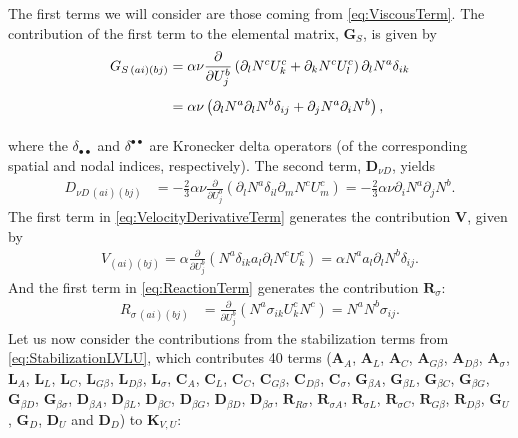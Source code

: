 The first terms we will consider are those coming from \cref{eq:ViscousTerm}. The contribution of the first term to the elemental matrix, $\mathbf{G}_S$, is given by
\begin{align} \label{eq:GSComponents}
  G_{S\, (ai)(bj)} & = \alpha \nu \frac{\partial }{\partial U_j^b} \left( \partial_l N^c U_k^c + \partial_k N^c U_l^c \right) \partial_l N^a \delta_{ik} \notag         \\
                   & \vphantom{\frac{\partial }{\partial U_j^b}} = \alpha \nu \left( \partial_l N^a \partial_l N^b \delta_{ij} + \partial_j N^a \partial_i N^b \right),
\end{align}
where the $\delta_{\bullet \bullet}$ and $\delta^{\bullet \bullet}$ are Kronecker delta operators (of the corresponding spatial and nodal indices, respectively).
The second term, $\mathbf{D}_{\nu D}$, yields
\begin{align} \label{eq:DDComponents}
  D_{\nu D\, (ai)(bj)} & = - \frac{2}{3} \alpha \nu \frac{\partial }{\partial U_j^b} \left( \partial_l N^a \delta_{il} \partial_m N^c U_m^c \right) = - \frac{2}{3} \alpha \nu \partial_i N^a \partial_j N^b.
\end{align}
The first term in \cref{eq:VelocityDerivativeTerm} generates the contribution $\mathbf{V}$, given by
\begin{align} \label{eq:VComponents}
  V_{(ai)(bj)} = \alpha \frac{\partial }{\partial U_j^b} \left( N^a \delta_{ik} a_l \partial_l N^c U_k^c \right) = \alpha N^a a_l \partial_l N^b \delta_{ij}.
\end{align}
And the first term in \cref{eq:ReactionTerm} generates the contribution $\mathbf{R}_\sigma$:
\begin{align} \label{eq:ReactionTermComponents}
  R_{\sigma\, (ai)(bj)} & = \frac{\partial }{\partial U_j^b} \left( N^a \sigma_{ik} U^c_k N^c \right) = N^aN^b \sigma_{ij}.
\end{align}
Let us now consider the contributions from the stabilization terms from \cref{eq:StabilizationLVLU}, which contributes 40 terms ($\mathbf{A}_A$, $\mathbf{A}_L$, $\mathbf{A}_C$, $\mathbf{A}_{G\beta}$, $\mathbf{A}_{D\beta}$, $\mathbf{A}_\sigma$, $\mathbf{L}_A$, $\mathbf{L}_L$, $\mathbf{L}_C$, $\mathbf{L}_{G\beta}$, $\mathbf{L}_{D\beta}$, $\mathbf{L}_\sigma$, $\mathbf{C}_A$, $\mathbf{C}_L$, $\mathbf{C}_C$, $\mathbf{C}_{G\beta}$, $\mathbf{C}_{D\beta}$, $\mathbf{C}_\sigma$, $\mathbf{G}_{\beta A}$, $\mathbf{G}_{\beta L}$, $\mathbf{G}_{\beta C}$, $\mathbf{G}_{\beta G}$, $\mathbf{G}_{\beta D}$, $\mathbf{G}_{\beta \sigma}$, $\mathbf{D}_{\beta A}$, $\mathbf{D}_{\beta L}$, $\mathbf{D}_{\beta C}$, $\mathbf{D}_{\beta G}$, $\mathbf{D}_{\beta D}$, $\mathbf{D}_{\beta \sigma}$, $\mathbf{R}_{R\sigma}$, $\mathbf{R}_{\sigma A}$, $\mathbf{R}_{\sigma L}$, $\mathbf{R}_{\sigma C}$, $\mathbf{R}_{G\beta}$, $\mathbf{R}_{D\beta}$, $\mathbf{G}_U$, $\mathbf{G}_{D}$, $\mathbf{D}_U$ and $\mathbf{D}_{D}$) to $\mathbf{K}_{V, U}$:

